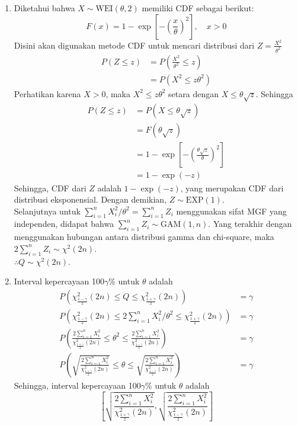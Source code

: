 \documentclass{exam}
\begin{document}
\begin{enumerate}
\begin{solution}
\begin{enumerate}
            \item Diketahui bahwa \( X \sim \text{WEI}(\theta, 2) \) memiliki CDF sebagai berikut:
            \[F(x) = 1 - \exp\left[-\left(\frac{x}{\theta}\right)^2\right], \quad x > 0\]
            Disini akan digunakan metode CDF untuk mencari distribusi dari $Z=\frac{X^2}{\theta^2}$
            \begin{align*}
                P(Z \leq z) &= P\left(\frac{X^2}{\theta^2} \leq z\right) \\
                &= P\left(X^2 \leq z\theta^2\right) 
            \end{align*}
            Perhatikan karena $X>0$, maka $X^2 \leq z\theta^2$ setara dengan $X \leq \theta \sqrt{z}$. Sehingga
            \begin{align*}
                P(Z \leq z)&= P\left(X \leq \theta \sqrt{z}\right) \\
                &= F(\theta \sqrt{z}) \\
                &= 1 - \exp\left[-\left(\frac{\theta \sqrt{z}}{\theta}\right)^2\right] \\
                &= 1 - \exp\left(-z\right)
            \end{align*}
            Sehingga, CDF dari $Z$ adalah $1 - \exp(-z)$, yang merupakan CDF dari distribusi eksponensial. Dengan demikian, \( Z \sim \text{EXP}(1) \).\\
            Selanjutnya untuk $\sum_{i=1}^n X_i^2/\theta^2= \sum_{i=1}^n Z_i$ menggunakan sifat MGF yang independen, didapat bahwa $\sum_{i=1}^n Z_i \sim \text{GAM}(1, n)$. Yang terakhir dengan menggunakan hubungan antara distribusi gamma dan chi-square, maka $2\sum_{i=1}^n Z_i \sim \chi^2(2n)$.\\

            $\therefore Q \sim \chi^2(2n)$.

            \item Interval kepercayaan 100\( \gamma\% \) untuk \( \theta \) adalah
            \begin{align*}
                P\left(\chi^2_{\frac{1-\gamma}{2}}(2n) \leq Q \leq \chi^2_{\frac{1+\gamma}{2}}(2n)\right) &=\gamma \\
                P\left(\chi^2_{\frac{1-\gamma}{2}}(2n) \leq 2\sum_{i=1}^n X_i^2/\theta^2 \leq \chi^2_{\frac{1+\gamma}{2}}(2n)\right) &= \gamma \\
                P\left(\frac{2\sum_{i=1}^n X_i^2}{\chi^2_{\frac{1+\gamma}{2}}(2n)} \leq \theta^2 \leq \frac{2\sum_{i=1}^n X_i^2}{\chi^2_{\frac{1-\gamma}{2}}(2n)}\right) &= \gamma \\
                P\left(\sqrt{\frac{2\sum_{i=1}^n X_i^2}{\chi^2_{\frac{1+\gamma}{2}}(2n)}} \leq \theta \leq \sqrt{\frac{2\sum_{i=1}^n X_i^2}{\chi^2_{\frac{1-\gamma}{2}}(2n)}}\right) &= \gamma
            \end{align*}
            Sehingga, interval kepercayaan 100\( \gamma\% \) untuk \(\theta\) adalah
            \[\left[\sqrt{\frac{2\sum_{i=1}^n X_i^2}{\chi^2_{\frac{1+\gamma}{2}}(2n)}}, \sqrt{\frac{2\sum_{i=1}^n X_i^2}{\chi^2_{\frac{1-\gamma}{2}}(2n)}}\right]\]


\end{enumerate}
\end{solution}
\end{enumerate}
\end{document}
